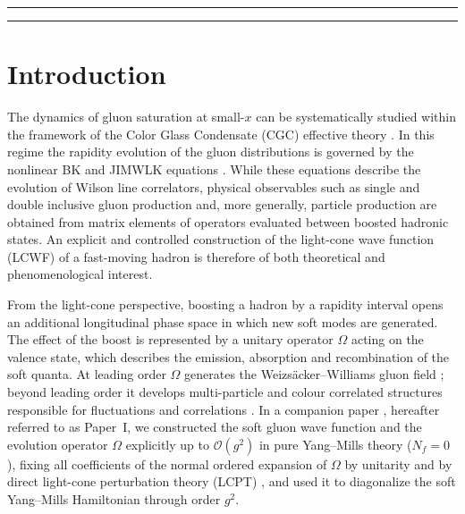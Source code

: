 \documentclass[11pt,a4paper]{article}
\numberwithin{equation}{section}
\newcommand{\OM}{\Omega}
\newcommand{\order}[1]{\mathcal{O}(#1)}
\newcommand{\Nf}{N_{f}}
\begin{document}
\vspace{0.6cm}
\hrule
\tableofcontents
\vspace{0.3cm}
\hrule
\newpage

\section{Introduction}
\label{sec:intro}

The dynamics of gluon saturation \cite{Morreale:2021pnn,Albacete:2014fwa,Blaizot:2016qgz,Mueller:1985wy}
at small-$x$ can be systematically studied within the framework of the Color Glass Condensate
(CGC) effective theory \cite{Gelis:2010nm,Weigert:2005us,McLerran:1993ni,McLerran:1993ka,Balitsky:2001gj,Garcia-Montero:2025hys}.
In this regime the rapidity evolution of the gluon distributions is governed by the nonlinear
BK and JIMWLK equations \cite{Iancu:2001ad,Iancu:2000hn,Weigert:2000gi,Kovner:2000pt,Jalilian-Marian:1997jx,Jalilian-Marian:1997gr,Jalilian-Marian:1996mkd,Kovchegov:1999yj,Kovchegov:1999ua,Lublinsky:2016meo,Kovner:2014lca,Kovner:2013ona}.
While these equations describe the evolution of Wilson line correlators, physical observables
such as single and double inclusive gluon production \cite{Kovner:2011pe,Altinoluk:2018byz} and,
more generally, particle production \cite{Iancu:2020mos,Dominguez:2012ad,Altinoluk:2011qy,Blaizot:2004wv,Kovchegov:2006qn,Dumitru:2005gt}
are obtained from matrix elements of operators evaluated between boosted hadronic states.
An explicit and controlled construction of the light-cone wave function (LCWF) of a fast-moving
hadron is therefore of both theoretical and phenomenological interest.

From the light-cone perspective, boosting a hadron by a rapidity interval opens an additional
longitudinal phase space in which new soft modes are generated. The effect of the boost is
represented by a unitary operator $\OM$ acting on the valence state, which describes the
emission, absorption and recombination of the soft quanta. At leading order $\OM$ generates the
Weizs\"acker--Williams gluon field \cite{Kovner:2005pe,Kovner:2006wr}; beyond leading order it
develops multi-particle and colour correlated structures responsible for fluctuations and
correlations \cite{Kovner:2016jfp}. In a companion paper \cite{PaperI}, hereafter referred to as
Paper~I, we constructed the soft gluon wave function and the evolution operator $\OM$ explicitly
up to $\order{g^{2}}$ in pure Yang--Mills theory ($\Nf=0$), fixing all coefficients of the
normal ordered expansion of $\OM$ by unitarity and by direct light-cone perturbation theory
(LCPT) \cite{Lepage:1980fj,Brodsky:1997de,Munier:2025unitary}, and used it to diagonalize the
soft Yang--Mills Hamiltonian through order $g^{2}$.
\end{document}
